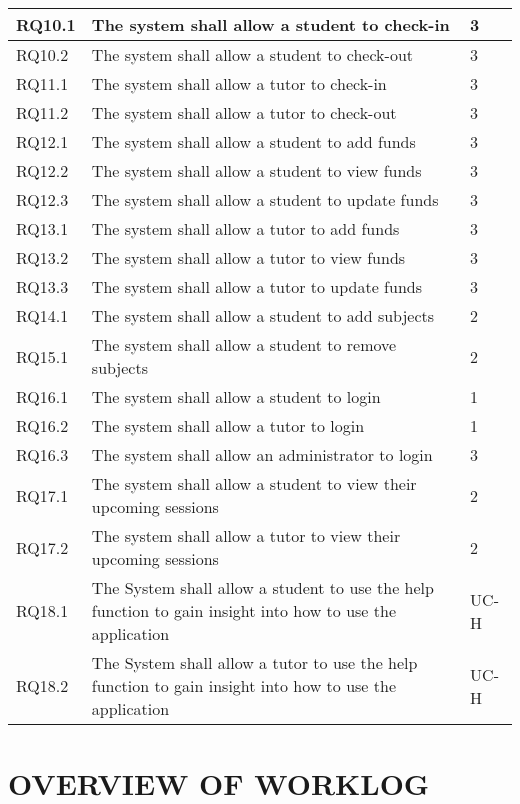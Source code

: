\documentclass[12pt]{article}
\begin{document}
{\begin{longtable}{| l | p{10cm}| l |}
				RQ10.1 & The system shall allow a student to check-in  & 3\\ \hline	
				RQ10.2 & The system shall allow a student to check-out  & 3\\ \hline
				RQ11.1 & The system shall allow a tutor to check-in  & 3\\ 
\hline	
				RQ11.2 & The system shall allow a tutor to check-out  & 3\\ \hline
				RQ12.1 & The system shall allow a student to add funds & 3\\ \hline
				RQ12.2 & The system shall allow a student to view funds & 3\\ \hline
				RQ12.3 & The system shall allow a student to update funds & 3\\ \hline
				RQ13.1 & The system shall allow a tutor to add funds & 3\\ \hline
				RQ13.2 & The system shall allow a tutor to view funds & 3\\ \hline
				RQ13.3 & The system shall allow a tutor to update funds & 3\\ \hline
				RQ14.1 & The system shall allow a student to add subjects & 2\\ \hline
				RQ15.1 & The system shall allow a student to remove subjects & 2\\ \hline
				RQ16.1 & The system shall allow a student to login & 1\\ \hline
				RQ16.2 & The system shall allow a tutor to login & 1\\ \hline
				RQ16.3 & The system shall allow an administrator to login & 3\\ \hline
				RQ17.1 & The system shall allow a student to view their upcoming sessions  & 2\\ \hline
				RQ17.2 & The system shall allow a tutor to view their upcoming sessions  & 2\\ \hline
				RQ18.1 & The System shall allow a student to use the help function to gain insight into how to use the application & UC-H\\ \hline
						RQ18.2 & The System shall allow a tutor to use the help function to gain insight into how to use the application & UC-H\\ \hline
			
\end{longtable}



\section{OVERVIEW OF WORKLOG }
}
\end{document}
